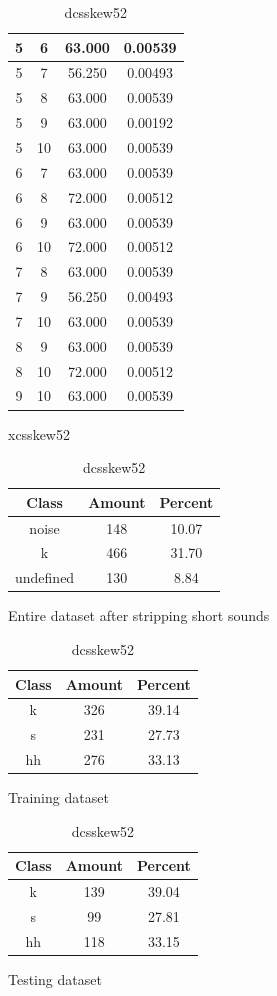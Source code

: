 \begin{table}
\begin{subtable}[tbp]{0.45\textwidth}
{\begin{tabular}{|c|c|c|c|}
 5 & 6 & 63.000 & 0.00539\\ \hline 
 5 & 7 & 56.250 & 0.00493\\ \hline 
 5 & 8 & 63.000 & 0.00539\\ \hline 
 5 & 9 & 63.000 & 0.00192\\ \hline 
 5 & 10 & 63.000 & 0.00539\\ \hline 
 6 & 7 & 63.000 & 0.00539\\ \hline 
 6 & 8 & 72.000 & 0.00512\\ \hline 
 6 & 9 & 63.000 & 0.00539\\ \hline 
 6 & 10 & 72.000 & 0.00512\\ \hline 
 7 & 8 & 63.000 & 0.00539\\ \hline 
 7 & 9 & 56.250 & 0.00493\\ \hline 
 7 & 10 & 63.000 & 0.00539\\ \hline 
 8 & 9 & 63.000 & 0.00539\\ \hline 
 8 & 10 & 72.000 & 0.00512\\ \hline 
 9 & 10 & 63.000 & 0.00539\\ \hline 

\end{tabular}
} \label{xlsskew52}
\caption{xcsskew52}
\end{subtable}

\begin{subtable}[tbp]{0.45\textwidth}
\centering
\begin{tabular}{|c|c|c|}
\hline
Class & Amount & Percent\\ \hline
noise & 148 & 10.07\\ \hline
k & 466 & 31.70\\ \hline
undefined & 130 & 8.84\\ \hline
\end{tabular}
\caption{Entire dataset after stripping short sounds}
\end{subtable}
\hfill
\begin{subtable}[tbp]{0.45\textwidth}
\centering
\begin{tabular}{|c|c|c|}
\hline
Class & Amount & Percent\\ \hline
k & 326 & 39.14\\ \hline
s & 231 & 27.73\\ \hline
hh & 276 & 33.13\\ \hline
\end{tabular}
\caption{Training dataset}
\end{subtable}
\hfill
\begin{subtable}[tbp]{0.45\textwidth}
\centering
\begin{tabular}{|c|c|c|}
\hline
Class & Amount & Percent\\ \hline
k & 139 & 39.04\\ \hline
s & 99 & 27.81\\ \hline
hh & 118 & 33.15\\ \hline
\end{tabular}
\caption{Testing dataset}
\end{subtable}
\hfill

\label{dlsskew52}

\caption{dcsskew52}

\end{table}\clearpage
